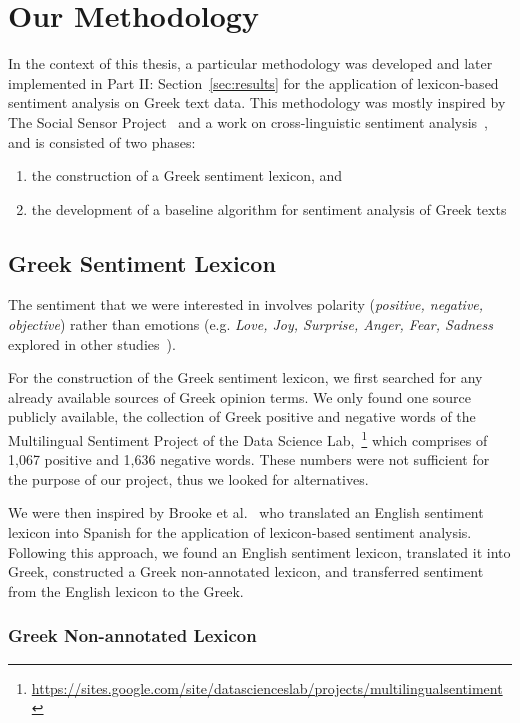 \section{Our Methodology}
\label{sec:methodology}

In the context of this thesis,
a particular methodology was developed
and later implemented in Part II: Section~\ref{sec:results}
for the application of lexicon-based sentiment analysis on Greek text data.
This methodology was mostly inspired by The Social Sensor Project~\cite{BPP14} and a work on cross-linguistic sentiment analysis~\cite{BTT09},
and is consisted of two phases:

\begin{enumerate}
 \item the construction of a Greek sentiment lexicon, and
 \item the development of a baseline algorithm for sentiment analysis of Greek texts
\end{enumerate}

\subsection{Greek Sentiment Lexicon}
\label{subsec:lexicon}

The sentiment that we were interested in involves polarity
(\emph{positive, negative, objective})
rather than emotions
(e.g. \emph{Love, Joy, Surprise, Anger, Fear, Sadness}
explored in other studies~\cite{CLNQ19}).

For the construction of the Greek sentiment lexicon,
we first searched for any already available sources of Greek opinion terms.
We only found one source publicly available,
the collection of Greek positive and negative words
of the Multilingual Sentiment Project
of the Data Science Lab,~\footnote{\url{https://sites.google.com/site/datascienceslab/projects/multilingualsentiment}}
which comprises of 1,067 positive and 1,636 negative words.
These numbers were not sufficient for the purpose of our project,
thus we looked for alternatives.

We were then inspired by Brooke et al.~\cite{BTT09}
who translated an English sentiment lexicon into Spanish
for the application of lexicon-based sentiment analysis.
Following this approach,
we found an English sentiment lexicon,
translated it into Greek,
constructed a Greek non-annotated lexicon,
and transferred sentiment from the English lexicon to the Greek.

\subsubsection{Greek Non-annotated Lexicon}
\label{subsubsec:greek}

